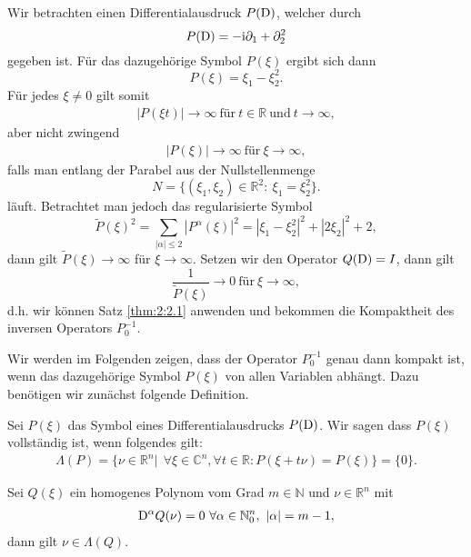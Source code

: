 \begin{exa}
Wir betrachten einen Differentialausdruck $P(\mathrm D)$, welcher durch
\begin{equation}
P(\mathrm D) = -\mathrm i\partial_1 + \partial_2^2
\end{equation}
gegeben ist. Für das dazugehörige Symbol $P(\xi)$ ergibt sich dann
\begin{equation}
P(\xi) = \xi_1 - \xi_2^2.
\end{equation}
Für jedes $\xi \not = 0$ gilt somit
\begin{align}
|P(\xi t)| \rightarrow \infty \ \text{für} \ t\in \mathbb{R} \ \text{und} \ t \rightarrow \infty,
\end{align}
aber nicht zwingend
\begin{align}
|P(\xi)| \rightarrow \infty \ \text{für} \ \xi \rightarrow \infty,
\end{align}
falls man entlang der Parabel aus der Nullstellenmenge\begin{equation}
N= \{ (\xi_1,\xi_2)\in \mathbb{R}^2 : \ \xi_1 = \xi_2^2 \}.
\end{equation}
läuft. Betrachtet man jedoch das regularisierte Symbol
\begin{equation}
\widetilde{P}(\xi)^2 = \sum_{|\alpha| \leq 2} |P^{\alpha}(\xi)|^2 = |\xi_1 - \xi_2^2|^2 + |2\xi_2|^2 + 2,
\end{equation}
dann gilt $\widetilde{P}(\xi) \rightarrow \infty$ für $\xi \rightarrow \infty$. Setzen wir den Operator $Q(\mathrm D)=I$, dann gilt
\begin{equation}
\frac{1}{\widetilde{P}(\xi)} \rightarrow 0 \ \text{für} \ \xi \rightarrow \infty,
\end{equation}
d.h. wir können Satz \ref{thm:2:2.1} anwenden und bekommen die Kompaktheit des inversen Operators $P_0^{-1}$.
\end{exa}
Wir werden im Folgenden zeigen, dass der Operator $P_0^{-1}$ genau dann kompakt ist, wenn das dazugehörige Symbol $P(\xi)$ von allen Variablen abhängt. Dazu benötigen wir zunächst folgende Definition.
\begin{df}
Sei $P(\xi)$ das Symbol eines Differentialausdrucks $P(\mathrm D)$. Wir sagen dass $P(\xi)$ vollständig ist, wenn folgendes gilt:
\begin{align*}
\Lambda(P)=\{ \nu \in \mathbb{R}^n| \ \ \forall \xi \in \mathbb{C}^n, \forall t \in \mathbb{R}: P(\xi + t\nu) = P(\xi)  \} = \{0\}.
\end{align*}
\end{df}
\begin{lem}\label{Lema:homogene Polynome} 
Sei $Q(\xi)$ ein homogenes Polynom vom Grad $m \in \mathbb{N}$ und  $\nu \in \mathbb{R}^n$ mit
\begin{align*}
\mathrm D^{\alpha}Q(\nu)=0 \ \forall \alpha \in \mathbb{N}_0^{n}, \ |\alpha| = m-1,
\end{align*}
dann gilt $\nu \in \Lambda(Q)$.
\end{lem}
